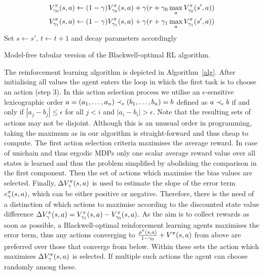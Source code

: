 \documentclass[envcountsame]{llncs}
\newcommand\MS[2][r]{\ifx t#1 \textcolor{blue}{[\textbf{MS:} #2]}
  \else \begin{center}\textcolor{blue}{\textbf{MS:} #2} \end{center} \fi}
\begin{document}
\begin{algorithm}[t!]
\begin{algorithmic}[1]
\begin{align*}
    \end{align*}
    \begin{align*}
      V^\pi_{\gamma_0}(s,a)    & \gets (1-\gamma) V^\pi_{\gamma_0}(s,a) + \gamma (r + \gamma_{0} \max_{a} V^\pi_{\gamma_0}(s',a)) \\
      V^\pi_{\gamma_1}(s,a)    & \gets (1-\gamma) V^\pi_{\gamma_1}(s,a) + \gamma (r + \gamma_{1} \max_{a} V^\pi_{\gamma_1}(s',a))
    \end{align*}
    \State{}Set \(s \gets s'\), \(t \gets t+1\) and decay parameters accordingly
    \EndWhile{}
  \end{algorithmic}
  \caption{\label{alg}Model-free tabular version of the Blackwell-optimal RL algorithm.}
\end{algorithm}



The reinforcement learning algorithm is depicted in Algorithm~\ref{alg}. After initialising all
values the agent enters the loop in which the first task is to choose an action (step 3). In this
action selection process we utilise an \(\epsilon\)-sensitive lexicographic order
\(a=(a_{1},\ldots,a_{n}) \prec_{\epsilon} (b_{1},\ldots,b_{n})=b\) defined as \(a \prec_{\epsilon} b\) if and only if
\(| a_{j} - b_{j} | \leqslant \epsilon\) for all \(j < i\) and \(|a_{i} - b_{i}| > \epsilon\). Note
that the resulting sets of actions may not be disjoint. Although this is an unusual order in
programming, taking the maximum as in our algorithm is straight-forward and thus cheap to compute.
%
The first action selection criteria maximises the average reward. In case of unichain and thus
ergodic MDPs only one scalar average reward value over all states is learned and thus the problem
simplified by abolishing the comparison in the first component. Then the set of actions which
maximise the bias values are selected. Finally, \(\Delta V^\pi_\gamma(s,a)\) is used to estimate
the slope of the error term \(e_{\gamma}^{\pi}(s,a)\), which can be either positive or negative.
Therefore, there is the need of a distinction of which actions to maximise according to the
discounted state value difference
\(\Delta V^{\pi}_{\gamma}(s,a) = V^\pi_{\gamma_1}(s,a) - V^\pi_{\gamma_0}(s,a)\). As the aim is
to collect rewards as soon as possible, a Blackwell-optimal reinforcement learning agents maximises
the error term, thus any actions converging to
\(\frac{\rho^{\pi}(s,a)}{1-\gamma_{0}} + V^{\pi}(s,a)\) from above are preferred over those
that converge from below. Within these sets the action which maximises
\(\Delta V^{\pi}_{\gamma}(s,a)\) is selected. If multiple such actions the agent can choose
randomly among these.
\end{document}
